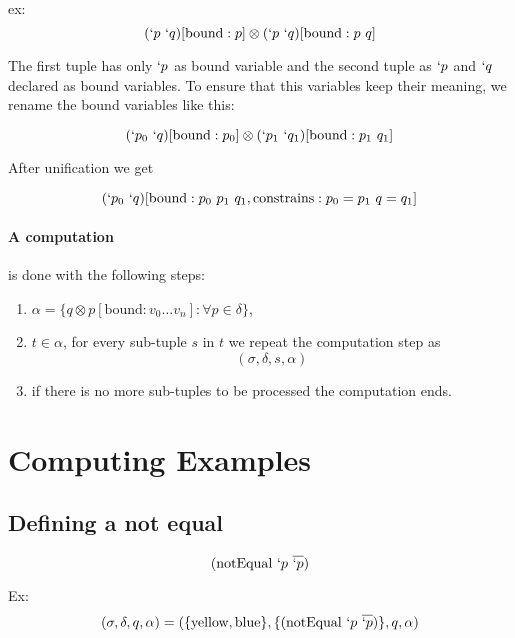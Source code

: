 \documentclass[11pt,a4paper]{report}
\newcommand{\var}[1]{`#1}
\newcommand{\unify}{\otimes}
\begin{document}
ex: 
\[
    (\var{p}\ \var{q})[\text{bound}: p] \unify (\var{p}\ \var{q})[\text{bound}: p\ q]
\]

The first tuple has only $\var{p}$ as bound variable and the second tuple as $\var{p}$ and $\var{q}$ declared as bound variables.
To ensure that this variables keep their meaning, we rename the bound variables like this:

\[
    (\var{p_{0}}\ \var{q})[\text{bound}: p_{0}] \unify (\var{p_{1}}\ \var{q_{1}})[\text{bound}: p_{1}\ q_{1}]
\]

After unification we get

\[
    (\var{p_{0}}\ \var{q})[\text{bound}: p_{0}\ p_{1}\ q_{1}, \text{constrains}: p_{0}=p_{1}\ q=q_{1}]
\]



\paragraph{A computation} is done with the following steps:

\begin{enumerate}
    \item $\alpha = \{q \unify p[\text{bound}: v_{0} \ldots v_{n}] :\forall p \in \delta\}$,
    \item $t \in \alpha$, for every sub-tuple $s$ in $t$ we repeat the computation step as
    \[(\sigma, \delta, s, \alpha)\]
    \item if there is no more sub-tuples to be processed the computation ends.
\end{enumerate}

\section{Computing Examples}

\subsection{Defining a not equal}

\[ 
    (\text{notEqual}\ \var{p}\ \overline{\var{p}})
\] 

Ex:
\[(\sigma, \delta, q, \alpha ) = (\{\text{yellow}, \text{blue}\}, \{(\text{notEqual}\ \var{p}\ \overline{\var{p}})\}, q, \alpha)\]
\end{document}
